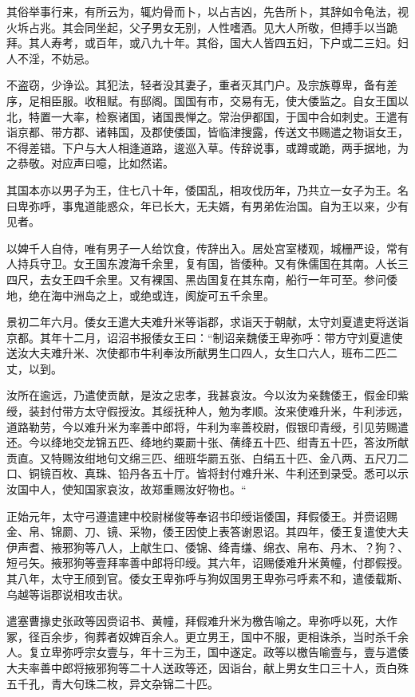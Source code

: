 \documentclass[12pt,UTF8]{ctexbook}
\begin{document}
其俗举事行来，有所云为，辄灼骨而卜，以占吉凶，先告所卜，其辞如令龟法，视火坼占兆。其会同坐起，父子男女无别，人性嗜酒。见大人所敬，但搏手以当跪拜。其人寿考，或百年，或八九十年。其俗，国大人皆四五妇，下户或二三妇。妇人不淫，不妨忌。

不盗窃，少诤讼。其犯法，轻者没其妻子，重者灭其门户。及宗族尊卑，备有差序，足相臣服。收租赋。有邸阁。国国有市，交易有无，使大倭监之。自女王国以北，特置一大率，检察诸国，诸国畏惮之。常治伊都国，于国中合如刺史。王遣有诣京都、带方郡、诸韩国，及郡使倭国，皆临津搜露，传送文书赐遣之物诣女王，不得差错。下户与大人相逢道路，逡巡入草。传辞说事，或蹲或跪，两手据地，为之恭敬。对应声曰噫，比如然诺。

其国本亦以男子为王，住七八十年，倭国乱，相攻伐历年，乃共立一女子为王。名曰卑弥呼，事鬼道能惑众，年已长大，无夫婿，有男弟佐治国。自为王以来，少有见者。

以婢千人自侍，唯有男子一人给饮食，传辞出入。居处宫室楼观，城栅严设，常有人持兵守卫。女王国东渡海千余里，复有国，皆倭种。又有侏儒国在其南。人长三四尺，去女王四千余里。又有裸国、黑齿国复在其东南，船行一年可至。参问倭地，绝在海中洲岛之上，或绝或连，阂旋可五千余里。

景初二年六月。倭女王遣大夫难升米等诣郡，求诣天于朝献，太守刘夏遣吏将送诣京都。其年十二月，诏沼书报倭女王曰：“制诏亲魏倭王卑弥呼：带方守刘夏遣使送汝大夫难升米、次使都市牛利奉汝所献男生口四人，女生口六人，班布二匹二丈，以到。

汝所在逾远，乃遣使贡献，是汝之忠孝，我甚哀汝。今以汝为亲魏倭王，假金印紫绶，装封付带方太守假授汝。其绥抚种人，勉为孝顺。汝来使难升米，牛利涉远，道路勒劳，今以难升米为率善中郎将，牛利为率善校尉，假银印青绶，引见劳赐遣还。今以绛地交龙锦五匹、绛地约粟罽十张、蒨绛五十匹、绀青五十匹，答汝所献贡直。又特赐汝绀地句文绵三匹、细班华罽五张、白绢五十匹、金八两、五尺刀二口、铜镜百枚、真珠、铅丹各五十厅。皆将封付难升米、牛利还到录受。悉可以示汝国中人，使知国家哀汝，故郑重赐汝好物也。“

正始元年，太守弓遵遣建中校尉梯俊等奉诏书印绶诣倭国，拜假倭王。并赍诏赐金、帛、锦罽、刀、镜、采物，倭王因使上表答谢恩诏。其四年，倭王复遣使大夫伊声耆、掖邪狗等八人，上献生口、倭锦、绛青缣、绵衣、帛布、丹木、？狗？、短弓矢。掖邪狗等壹拜率善中郎将印绶。其六年，诏赐倭难升米黄幢，付郡假授。其八年，太守王颀到官。倭女王卑弥呼与狗奴国男王卑弥弓呼素不和，遣倭载斯、乌越等诣郡说相攻击状。

遣塞曹掾史张政等因赍诏书、黄幢，拜假难升米为檄告喻之。卑弥呼以死，大作冢，径百余步，徇葬者奴婢百余人。更立男王，国中不服，更相诛杀，当时杀千余人。复立卑弥呼宗女壹与，年十三为王，国中遂定。政等以檄告喻壹与，壹与遣倭大夫率善中郎将掖邪狗等二十人送政等还，因诣台，献上男女生口三十人，贡白殊五千孔，青大句珠二枚，异文杂锦二十匹。
\end{document}
